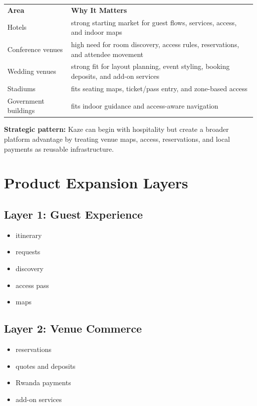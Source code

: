 \documentclass[11pt,a4paper]{article}
\begin{document}
\begin{longtable}{p{} p{}}
\textbf{Area} & \textbf{Why It Matters} \\
Hotels & strong starting market for guest flows, services, access, and indoor maps \\
Conference venues & high need for room discovery, access rules, reservations, and attendee movement \\
Wedding venues & strong fit for layout planning, event styling, booking deposits, and add-on services \\
Stadiums & fits seating maps, ticket/pass entry, and zone-based access \\
Government buildings & fits indoor guidance and access-aware navigation \\
\end{longtable}

\begin{kazehighlightbox}
\textbf{Strategic pattern:} Kaze can begin with hospitality but create a broader platform advantage by treating venue maps, access, reservations, and local payments as reusable infrastructure.
\end{kazehighlightbox}

\section{Product Expansion Layers}

\subsection{Layer 1: Guest Experience}
\begin{itemize}
    \item itinerary
    \item requests
    \item discovery
    \item access pass
    \item maps
\end{itemize}

\subsection{Layer 2: Venue Commerce}
\begin{itemize}
    \item reservations
    \item quotes and deposits
    \item Rwanda payments
    \item add-on services
\end{itemize}
\end{document}
